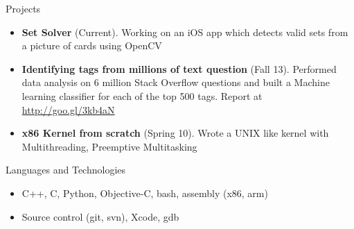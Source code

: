 \documentclass[]{mcdowellcv}
\begin{document}
	\begin{cvsection}{Projects}
		\begin{cvsubsection}{}{}{}	
			\begin{itemize}
				\item \textbf{Set Solver} (Current). Working on an iOS app which detects valid sets from a picture of cards using OpenCV
				\item \textbf{Identifying tags from millions of text question} (Fall 13). Performed data analysis on 6 million Stack Overflow questions and built a Machine learning classifier for  each of the top 500 tags. Report at \url{http://goo.gl/3kb4aN}
				\item \textbf{x86 Kernel from scratch} (Spring 10).  Wrote a UNIX like kernel with Multithreading, Preemptive Multitasking
			\end{itemize}
		\end{cvsubsection}
	\end{cvsection}
	
	\begin{cvsection}{Languages and Technologies}
		\begin{cvsubsection}{}{}{}	
			\begin{itemize}
				\item C++, C, Python, Objective-C, bash, assembly (x86, arm)
				\item Source control (git, svn), Xcode, gdb
			\end{itemize}
		\end{cvsubsection}
	\end{cvsection}
	
\end{document}
